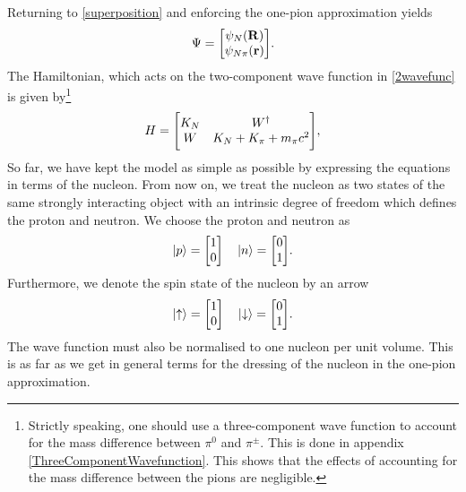 Returning to \eqref{superposition} and enforcing the one-pion approximation yields
\begin{equation} \label{2wavefunc}
	\Psi = \mqty[\psi_{N}(\vec{R})\\
	\psi_{N\pi}(\vec{r})].
\end{equation}
The Hamiltonian, which acts on the two-component wave function in \eqref{2wavefunc} is given by\footnote{Strictly speaking, one should use a three-component wave function to account for the mass difference between $\pi^0$ and $\pi^\pm$. This is done in appendix \ref{ThreeComponentWavefunction}. This shows that the effects of accounting for the mass difference between the pions are negligible.}
\begin{equation}\label{HamilTwo}
	H  =  \mqty[K_N & W^\dagger \\ W & K_N+K_\pi+m_\pi c^2],
\end{equation}
So far, we have kept the model as simple as possible by expressing the equations in terms of the nucleon. From now on, we treat the nucleon as two states of the same strongly interacting object with an intrinsic degree of freedom which defines the proton and neutron. We choose the proton and neutron as 
\begin{equation} \label{isospinvec}
	\ket{p} = \mqty[1 \\ 0 ] \quad \ket{n} = \mqty[0 \\ 1].
\end{equation} 
Furthermore, we denote the spin state of the nucleon by an arrow
\begin{equation} \label{spinvec}
	\ket{\uparrow} = \mqty[1 \\ 0 ] \quad  \ket{\downarrow}= \mqty[0 \\ 1].
\end{equation}
The wave function must also be normalised to one nucleon per unit volume. This is as far as we get in general terms for the dressing of the nucleon in the one-pion approximation.
